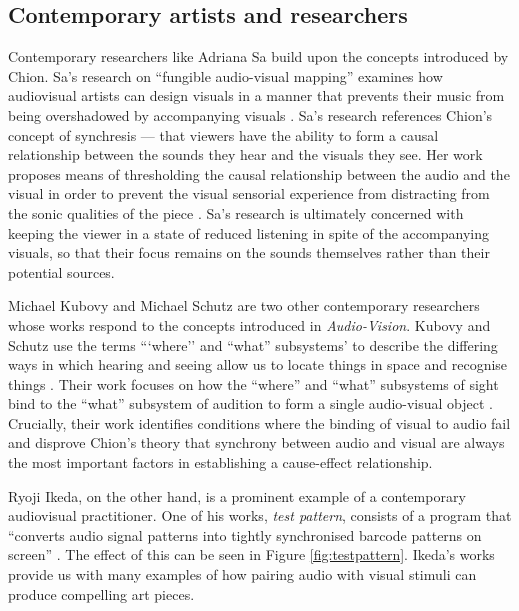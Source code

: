 \documentclass[../initial_thesis.tex]{subfiles}
\begin{document}
\subsection{Contemporary artists and researchers} %
Contemporary researchers like Adriana Sa build upon the concepts introduced by Chion. Sa's research on ``fungible audio-visual mapping'' examines how audiovisual artists can design visuals in a manner that prevents their music from being overshadowed by accompanying visuals \cite{Sa2014}. Sa's research references Chion's concept of synchresis --- that viewers have the ability to form a causal relationship between the sounds they hear and the visuals they see. Her work proposes means of thresholding the causal relationship between the audio and the visual in order to prevent the visual sensorial experience from distracting from the sonic qualities of the piece \cite{Sa2013}. Sa's research is ultimately concerned with keeping the viewer in a state of reduced listening in spite of the accompanying visuals, so that their focus remains on the sounds themselves rather than their potential sources. \par

Michael Kubovy and Michael Schutz are two other contemporary researchers whose works respond to the concepts introduced in \textit{Audio-Vision}. Kubovy and Schutz use the terms ```where'' and ``what'' subsystems' to describe the differing ways in which hearing and seeing allow us to locate things in space and recognise things \cite{Kubovy2010}. Their work focuses on how the ``where'' and ``what'' subsystems of sight bind to the ``what'' subsystem of audition to form a single audio-visual object \cite{Kubovy2010}. Crucially, their work identifies conditions where the binding of visual to audio fail and disprove Chion's theory that synchrony between audio and visual are always the most important factors in establishing a cause-effect relationship. \par

Ryoji Ikeda, on the other hand, is a prominent example of a contemporary audiovisual practitioner. One of his works, \textit{test pattern}, consists of a program that ``converts audio signal patterns into tightly synchronised barcode patterns on screen'' \cite{Ikeda}. The effect of this can be seen in Figure \ref{fig:testpattern}. Ikeda's works provide us with many examples of how pairing audio with visual stimuli can produce compelling art pieces. \par
\end{document}
